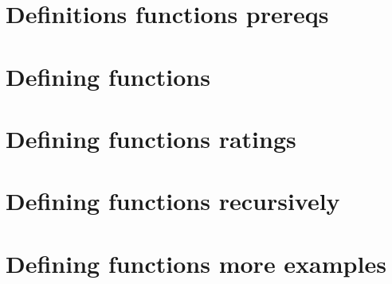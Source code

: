 \section*{Definitions functions prereqs}

\vfill
\section*{Defining functions}

\vfill
\section*{Defining functions ratings}

\vfill
\section*{Defining functions recursively}

\vfill
\section*{Defining functions more examples}

\vfill
